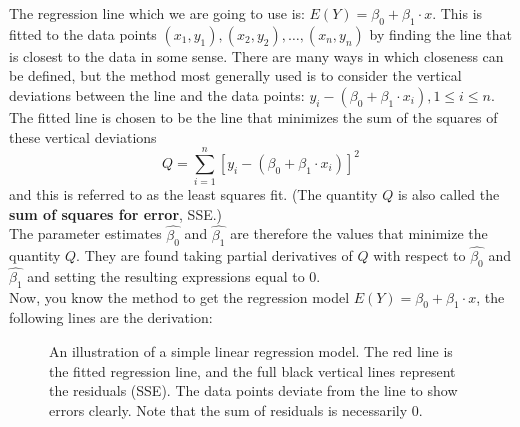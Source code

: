 The regression line which we are going to use is: $E(Y) = \beta_0 + \beta_1 \cdot x$. This is fitted to the data points $(x_1, y_1), (x_2, y_2), \ldots, (x_n, y_n)$ by finding the line that is closest to the data in some sense. There are many ways in which closeness can be defined, but the method most generally used is to consider the vertical deviations between the line and the data points: $y_i - (\beta_0 + \beta_1 \cdot x_i), 1 \leq i \leq n$.\\

The fitted line is chosen to be the line that minimizes the sum of the squares of these vertical deviations $$Q = \sum_{i=1}^{n} [y_i - (\beta_0 + \beta_1 \cdot x_i)]^2$$ and this is referred to as the least squares fit. (The quantity $Q$ is also called the \textbf{sum of squares for error}, SSE.)\\

The parameter estimates $\hat{\beta_0}$ and $\hat{\beta_1}$ are therefore the values that minimize the quantity $Q$. They are found taking partial derivatives of $Q$ with respect to $\hat{\beta_0}$ and $\hat{\beta_1}$ and setting the resulting expressions equal to $0$.\\

Now, you know the method to get the regression model $E(Y) = \beta_0 + \beta_1 \cdot x$, the following lines are the derivation:

\begin{figure}[h]
\centering
{}
\caption{An illustration of a simple linear regression model. The red line is the fitted regression line, and the full black vertical lines represent the residuals (SSE). The data points deviate from the line to show errors clearly. Note that the sum of residuals is necessarily $0$.}
\end{figure}

